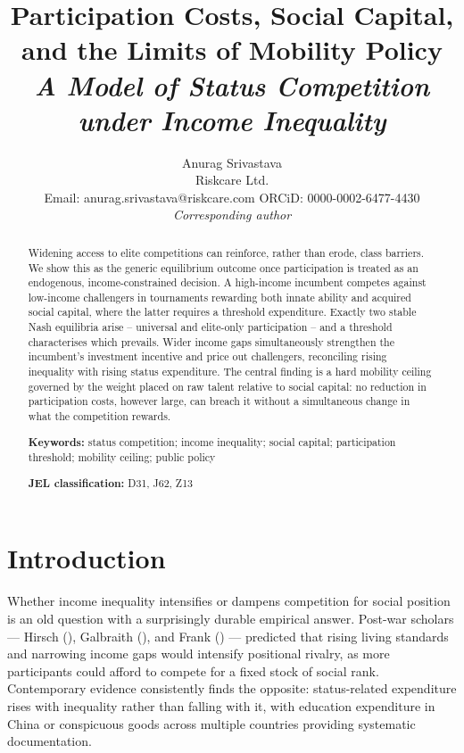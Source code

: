 \documentclass[
    oneside,
    fontsize=10pt,leqno]{article}
\begin{document}
\title{Participation Costs, Social Capital, and the Limits of Mobility Policy\\[4pt]
{\normalsize\itshape A Model of Status Competition under Income Inequality}}
\author{Anurag Srivastava\\
  \small Riskcare Ltd.\\
  \small Email: anurag.srivastava@riskcare.com \quad ORCiD: 0000-0002-6477-4430\\
  \small \textit{Corresponding author}}
\maketitle

\begin{abstract}

Widening access to elite competitions can reinforce, rather than
erode, class barriers. We show this as the generic equilibrium
outcome once participation is treated as an endogenous,
income-constrained decision. A high-income incumbent competes against
low-income challengers in tournaments rewarding both innate ability
and acquired social capital, where the latter requires a threshold
expenditure. Exactly two stable Nash equilibria arise -- universal
and elite-only participation -- and a threshold
characterises which prevails. Wider income gaps simultaneously
strengthen the incumbent's investment incentive and price out
challengers, reconciling rising inequality with rising status
expenditure. The central finding is a hard mobility ceiling governed
by the weight placed on raw talent relative to social capital: no
reduction in participation costs, however large, can breach it
without a simultaneous change in what the competition rewards. 

\medskip
\noindent\textbf{Keywords:} status competition; income inequality; social capital;
participation threshold; mobility ceiling; public policy

\medskip
\noindent\textbf{JEL classification:} D31, J62, Z13

\end{abstract}


\section{Introduction}

\noindent

Whether income inequality intensifies or dampens competition for
social position is an old question with a surprisingly durable
empirical answer. Post-war scholars --- Hirsch
(\citeyear{HirschSocialLimits}), Galbraith
(\citeyear{GalbraithAffluent}), and Frank (\citeyear{FrankPond})
--- predicted that rising living standards and narrowing income gaps
would intensify positional rivalry, as more participants could
afford to compete for a fixed stock of social rank. Contemporary
evidence consistently finds the opposite: status-related expenditure
rises with inequality rather than falling with it, with education
expenditure in China \citep{JinLiWu2011} or conspicuous goods across multiple countries
\citep{ChaiKausKiedaisch2019, JaikumarConspConIneq} providing systematic documentation.
\end{document}
